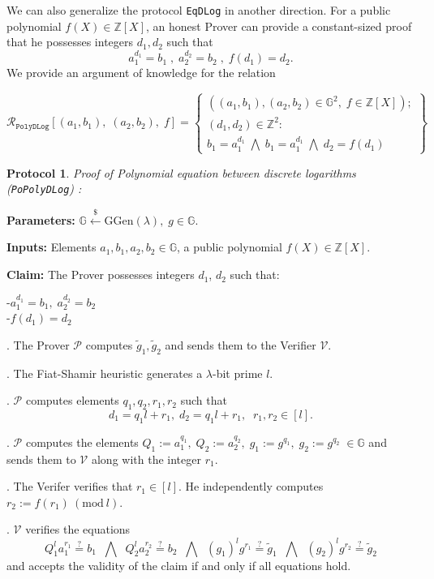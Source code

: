 \documentclass[11pt, lettersize, notitlepage, leqno, footskip=0.6cm]{article}
\newcommand{\bz}{\mathbb Z}
\newcommand{\ttt}{\texttt}
\newcommand{\wti}{\widetilde}
\newcommand{\mc}{\mathcal}
\newcommand{\mb}{\mathbb}
\newcommand{\mr}{\mathrm}
\newcommand{\lamb}{\lambda}
\newcommand{\vs}{\vspace{-0.15cm}}
\newcommand{\Mod}[1]{\ (\mathrm{mod}\ #1)}
\newtheorem{Prot}[Thm]{Protocol}
\numberwithin{equation}{section}
\begin{document}
\bigskip


\noindent We can also generalize the protocol \verb|EqDLog| in another direction. For a public polynomial {$f(X)\in \bz[X]$}, an honest Prover can provide a constant-sized proof that he possesses integers $d_1,d_2$ such that \vs $$a_1^{d_1} = b_1\;,\;a_2^{d_2} = b_2\;,\;f(d_1) = d_2.$$ We provide an argument of knowledge for the relation 

\[
  \mc{R}_{{\ttt{PolyDLog}}}[(a_1, b_1),\;(a_2,b_2),\;f] = \left\{\begin{array}{l}
    ((a_1, b_1), (a_2,b_2)\in\mb{G}^2,\;f\in\bz[X]);\\
    (d_1, d_2)\in\mb{Z}^2: \\
    b_1 = a_1^{d_1}\; \bigwedge\; b_1 = a_1^{d_1}\; \bigwedge \;d_2 = f(d_1)
  \end{array}\right\}
\] 

\vspace{0.2cm}


\begin{Prot} \normalfont \textit{Proof of Polynomial equation between discrete logarithms} (\verb|PoPolyDLog|) :\end{Prot} \vspace{-0.3cm}

\noindent \textbf{Parameters:} $\mb{G}\xleftarrow{\$} \mr{GGen}(\lamb), \; g\in \mb{G}$.

\noindent \textbf{Inputs:} Elements $a_1, b_1, a_2, b_2\in \mb{G}$, a public polynomial $f(X)\in\bz[X]$.

\noindent \textbf{Claim:} The Prover possesses integers $d_1$, $d_2$ such that:

\noindent -$a_1^{d_1} = b_1,\;  a_2^{d_2} = b_2$\\
-$f(d_1) = d_2$

\begin{prf1}. The Prover $\mc{P}$ computes $\wti{g}_1, \wti{g}_2$ and sends them to the Verifier $\mc{V}$.

. The Fiat-Shamir heuristic generates a $\lamb$-bit prime $l$.

. $\mc{P}$ computes elements $q_1, q_2, r_1, r_2$ such that \vs $$d_1 = q_1l+r_1,\; d_2 = q_1l+r_1,\;\; r_1,r_2\in [l].$$

. $\mc{P}$ computes the elements $Q_1:= a_1^{q_1},\;Q_2:= a_2^{q_2},\; g_1:= g^{q_1},\; g_2:= g^{q_2}\;\in\mb{G}$ and sends them to $\mc{V}$ along with the integer $r_1$.

. The Verifer verifies that $r_1\in [l]$. He independently computes $r_2:= f(r_1)\Mod{l}$.

. $\mc{V}$ verifies the equations \vs $$Q_1^{l}a_1^{r_1}\stackrel{?}{=} b_1\;\;\bigwedge\;\; Q_2^{l}a_2^{r_2}\stackrel{?}{=} b_2 \;\;\bigwedge\;\; (g_1)^lg^{r_1} \stackrel{?}{=} \wti{g}_1\;\;\bigwedge\;\; (g_2)^lg^{r_2} \stackrel{?}{=} \wti{g}_2 $$ and accepts the validity of the claim if and only if all equations hold.\end{prf1}
\end{document}
